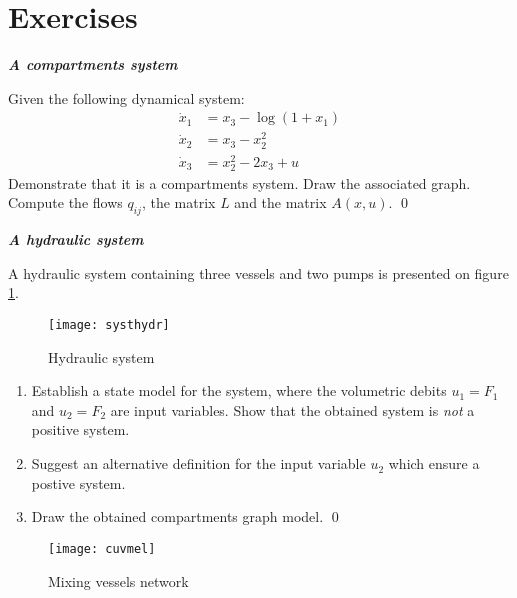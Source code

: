 \section{Exercises}

\begin{exercice}{\bf \em A compartments system}

Given the following dynamical system:
\begin{align*}
\dot x_{1} &= x_{3} - \log (1+x_{1}) \\
\dot x_{2} &= x_{3} - x_{2}^2 \\
\dot x_{3} &= x_{2}^2 - 2x_{3} + u
\end{align*}
Demonstrate that it is a compartments system. Draw the associated graph. Compute the flows $q_{ij}$, the matrix $L$ and the matrix $A(x,u)$. \qed
\end{exercice}
\vv

\begin{exercice}{\bf \em A hydraulic system}

A hydraulic system containing three vessels and two pumps is presented on figure \ref{Fig:systhydr}.
\begin{figure}[h]
\begin{center}
\texttt{[image: systhydr]}
\caption{Hydraulic system}
\label{Fig:systhydr}
\end{center} 
\end{figure}
\begin{enumerate}
\item Establish a state model for the system, where the volumetric debits $u_1 = F_1$ and $u_2 = F_2$ are input variables. 
Show that the obtained system is {\it not} a positive system. 
\item Suggest an alternative definition for the input variable $u_2$ which ensure a postive system. 
\item Draw the obtained compartments graph model. \qed
\end{enumerate}
\end{exercice}
\vv 

\begin{figure}[!ht] 
\begin{center}
\texttt{[image: cuvmel]}
\caption{Mixing vessels network}
\label{Fig:cuvmel}
\end{center} 
\end{figure}

